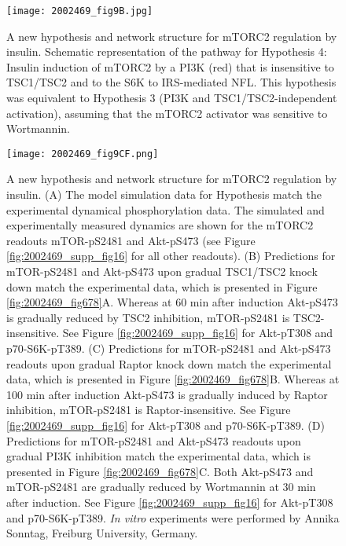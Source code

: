 \begin{figure}[tb]
	\begin{center}
		\texttt{[image: 2002469\_fig9B.jpg]}
		\caption[A new hypothesis and network structure for mTORC2 regulation by insulin]{A new hypothesis and network structure for mTORC2 regulation by insulin. Schematic representation of the pathway for Hypothesis 4: Insulin induction of mTORC2 by a PI3K (red) that is insensitive to TSC1/TSC2 and to the S6K to IRS-mediated NFL. This hypothesis was equivalent to Hypothesis 3 (PI3K and TSC1/TSC2-independent activation), assuming that the mTORC2 activator was sensitive to Wortmannin.}
		\label{fig:2002469_fig9B}
	\end{center}
\end{figure}

\clearpage
\begin{figure}[tb]
	\begin{center}
		\texttt{[image: 2002469\_fig9CF.png]}
		\caption[A new hypothesis and network structure for mTORC2 regulation by insulin]{A new hypothesis and network structure for mTORC2 regulation by insulin. (A) The model simulation data for Hypothesis match the experimental dynamical phosphorylation data. The simulated and experimentally measured dynamics are shown for the mTORC2 readouts mTOR-pS2481 and Akt-pS473 (see Figure \ref{fig:2002469_supp_fig16} for all other readouts). (B) Predictions for mTOR-pS2481 and Akt-pS473 upon gradual TSC1/TSC2 knock down match the experimental data, which is presented in Figure \ref{fig:2002469_fig678}A. Whereas at 60 min after induction Akt-pS473 is gradually reduced by TSC2 inhibition, mTOR-pS2481 is TSC2-insensitive. See Figure \ref{fig:2002469_supp_fig16} for Akt-pT308 and p70-S6K-pT389. (C) Predictions for mTOR-pS2481 and Akt-pS473 readouts upon gradual Raptor knock down match the experimental data, which is presented in Figure \ref{fig:2002469_fig678}B. Whereas at 100 min after induction Akt-pS473 is gradually 
induced by Raptor inhibition, mTOR-pS2481 is Raptor-insensitive. See Figure \ref{fig:2002469_supp_fig16} for Akt-pT308 and p70-S6K-pT389. (D) Predictions for mTOR-pS2481 and Akt-pS473 readouts upon gradual PI3K inhibition match the experimental data, which is presented in Figure \ref{fig:2002469_fig678}C. Both Akt-pS473 and mTOR-pS2481 are gradually reduced by Wortmannin at 30 min after induction. See Figure \ref{fig:2002469_supp_fig16} for Akt-pT308 and p70-S6K-pT389. \emph{In vitro} experiments were performed by Annika Sonntag, Freiburg University, Germany.}
		\label{fig:2002469_fig9CF}
	\end{center}
\end{figure}
\clearpage


